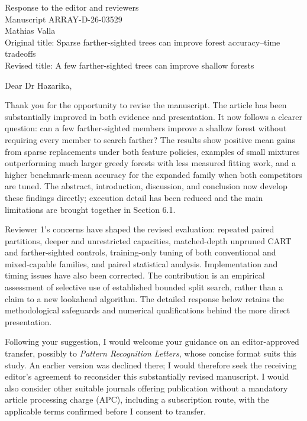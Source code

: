\documentclass[11pt]{article}
\begin{document}
\begin{center}
{\Large Response to the editor and reviewers}\\[6pt]
Manuscript ARRAY-D-26-03529\\
Mathias Valla\\
Original title: Sparse farther-sighted trees can improve forest accuracy--time tradeoffs\\
Revised title: A few farther-sighted trees can improve shallow forests
\end{center}

Dear Dr Hazarika,

Thank you for the opportunity to revise the manuscript. The article has been substantially improved in both evidence and presentation. It now follows a clearer question: can a few farther-sighted members improve a shallow forest without requiring every member to search farther? The results show positive mean gains from sparse replacements under both feature policies, examples of small mixtures outperforming much larger greedy forests with less measured fitting work, and a higher benchmark-mean accuracy for the expanded family when both competitors are tuned. The abstract, introduction, discussion, and conclusion now develop these findings directly; execution detail has been reduced and the main limitations are brought together in Section 6.1.

Reviewer 1's concerns have shaped the revised evaluation: repeated paired partitions, deeper and unrestricted capacities, matched-depth unpruned CART and farther-sighted controls, training-only tuning of both conventional and mixed-capable families, and paired statistical analysis. Implementation and timing issues have also been corrected. The contribution is an empirical assessment of selective use of established bounded split search, rather than a claim to a new lookahead algorithm. The detailed response below retains the methodological safeguards and numerical qualifications behind the more direct presentation.

Following your suggestion, I would welcome your guidance on an editor-approved transfer, possibly to \emph{Pattern Recognition Letters}, whose concise format suits this study. An earlier version was declined there; I would therefore seek the receiving editor's agreement to reconsider this substantially revised manuscript. I would also consider other suitable journals offering publication without a mandatory article processing charge (APC), including a subscription route, with the applicable terms confirmed before I consent to transfer.
\end{document}
